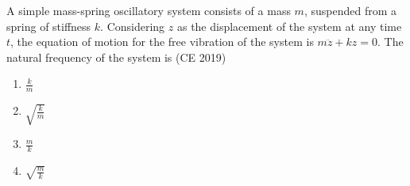     \item A simple mass-spring oscillatory system consists of a mass $m$, suspended from a spring of stiffness $k$. Considering $z$ as the displacement of the system at any time $t$, the equation of motion for the free vibration of the system is $m\ddot{z} + kz = 0$. The natural frequency of the system is  \hfill (CE 2019)
    \begin{multicols}{4}
        \begin{enumerate}
            \item $\frac{k}{m}$
            \item $\sqrt{\frac{k}{m}}$
            \item $\frac{m}{k}$
            \item $\sqrt{\frac{m}{k}}$
        \end{enumerate}
    \end{multicols}
